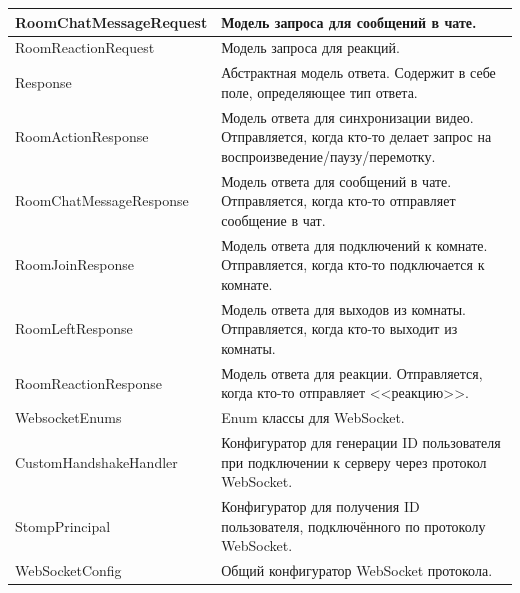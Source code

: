 \documentclass{../includes/TechDoc}
\begin{document}
\begin{table}[h]
\begin{tabularx}{\textwidth}{|l|X|}
            \hline
            RoomChatMessageRequest  & Модель запроса для сообщений в чате.                                                           \\
            \hline
            RoomReactionRequest     & Модель запроса для реакций.                                                                    \\
            \hline
            Response                & Абстрактная модель ответа. Содержит в себе поле, определяющее тип ответа.                                                                     \\
            \hline
            RoomActionResponse      & Модель ответа для синхронизации видео. Отправляется, когда кто-то делает запрос на воспроизведение/паузу/перемотку.                                                         \\
            \hline
            RoomChatMessageResponse & Модель ответа для сообщений в чате. Отправляется, когда кто-то отправляет сообщение в чат.                                                            \\
            \hline
            RoomJoinResponse        & Модель ответа для подключений к комнате. Отправляется, когда кто-то подключается к комнате.                                                       \\
            \hline
            RoomLeftResponse        & Модель ответа для выходов из комнаты. Отправляется, когда кто-то выходит из комнаты.                                                          \\
            \hline
            RoomReactionResponse    & Модель ответа для реакции. Отправляется, когда кто-то отправляет <<реакцию>>.                                                                     \\
            \hline
            WebsocketEnums          & Enum классы для WebSocket.                                                                     \\
            \hline
            CustomHandshakeHandler  & Конфигуратор для генерации ID пользователя при подключении к серверу через протокол WebSocket. \\
            \hline
            StompPrincipal          & Конфигуратор для получения ID пользователя, подключённого по протоколу WebSocket.              \\
            \hline
            WebSocketConfig         & Общий конфигуратор WebSocket протокола.                                                        \\

\end{tabularx}
\end{table}
\end{document}
